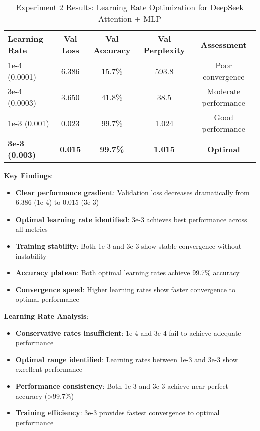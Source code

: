 \documentclass[11pt,a4paper]{article}
\begin{document}
\begin{table}[H]
\centering
\caption{Experiment 2 Results: Learning Rate Optimization for DeepSeek Attention + MLP}
\label{tab:exp2_results}
\begin{tabular}{@{}lcccc@{}}
\toprule
Learning Rate & Val Loss & Val Accuracy & Val Perplexity & Assessment \\
\midrule
1e-4 (0.0001) & 6.386 & 15.7\% & 593.8 & Poor convergence \\
3e-4 (0.0003) & 3.650 & 41.8\% & 38.5 & Moderate performance \\
1e-3 (0.001) & 0.023 & 99.7\% & 1.024 & Good performance \\
\textbf{3e-3 (0.003)} & \textbf{0.015} & \textbf{99.7\%} & \textbf{1.015} & \textbf{Optimal} \\
\bottomrule
\end{tabular}
\end{table}

\textbf{Key Findings}:
\begin{itemize}
    \item \textbf{Clear performance gradient}: Validation loss decreases dramatically from 6.386 (1e-4) to 0.015 (3e-3)
    \item \textbf{Optimal learning rate identified}: 3e-3 achieves best performance across all metrics
    \item \textbf{Training stability}: Both 1e-3 and 3e-3 show stable convergence without instability
    \item \textbf{Accuracy plateau}: Both optimal learning rates achieve 99.7\% accuracy
    \item \textbf{Convergence speed}: Higher learning rates show faster convergence to optimal performance
\end{itemize}

\textbf{Learning Rate Analysis}:
\begin{itemize}
    \item \textbf{Conservative rates insufficient}: 1e-4 and 3e-4 fail to achieve adequate performance
    \item \textbf{Optimal range identified}: Learning rates between 1e-3 and 3e-3 show excellent performance
    \item \textbf{Performance consistency}: Both 1e-3 and 3e-3 achieve near-perfect accuracy (>99.7\%)
    \item \textbf{Training efficiency}: 3e-3 provides fastest convergence to optimal performance
\end{itemize}
\end{document}
